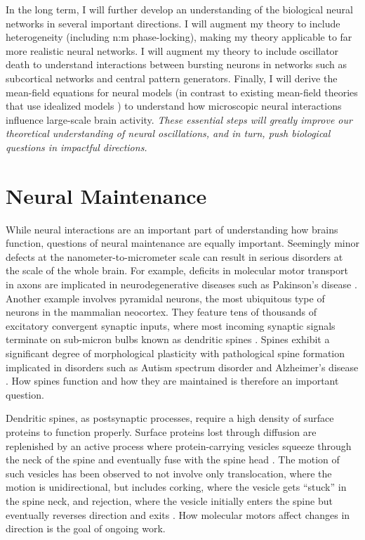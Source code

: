 \documentclass[a4paper,11pt]{article}
\begin{document}
In the long term, I will further develop an understanding of the biological neural networks in several important directions. I will augment my theory to include heterogeneity (including n:m phase-locking), making my theory applicable to far more realistic neural networks. I will augment my theory to include oscillator death to understand interactions between bursting neurons in networks such as subcortical networks and central pattern generators. Finally, I will derive the mean-field equations for neural models (in contrast to existing mean-field theories that use idealized models \cite{ott2008low}) to understand how microscopic neural interactions influence large-scale brain activity. \textit{These essential steps will greatly improve our theoretical understanding of neural oscillations, and in turn, push biological questions in impactful directions.}

\section{Neural Maintenance} \label{sec:maintenance}

While neural interactions are an important part of understanding how brains function, questions of neural maintenance are equally important. Seemingly minor defects at the nanometer-to-micrometer scale can result in serious disorders at the scale of the whole brain. For example, deficits in molecular motor transport in axons are implicated in neurodegenerative diseases such as Pakinson's disease \cite{millecamps2013axonal}. Another example involves pyramidal neurons, the most ubiquitous type of neurons in the mammalian neocortex. They feature tens of thousands of excitatory convergent synaptic inputs, where most incoming synaptic signals terminate on sub-micron bulbs known as dendritic spines \cite{nimchinsky2002structure}. Spines exhibit a significant degree of morphological plasticity \cite{kasai2010structural,holtmaat2009experience} with pathological spine formation implicated in disorders such as Autism spectrum disorder and Alzheimer's disease \cite{penzes2011dendritic}. How spines function and how they are maintained is therefore an important question.

Dendritic spines, as postsynaptic processes, require a high density of surface proteins to function properly. Surface proteins lost through diffusion are replenished by an active process where protein-carrying vesicles squeeze through the neck of the spine and eventually fuse with the spine head \cite{da2015positioning}. The motion of such vesicles has been observed to not involve only translocation, where the motion is unidirectional, but includes corking, where the vesicle gets ``stuck'' in the spine neck, and rejection, where the vesicle initially enters the spine but eventually reverses direction and exits \cite{park2006plasticity,wang2008myosin}. How molecular motors affect changes in direction is the goal of ongoing work.
\end{document}
